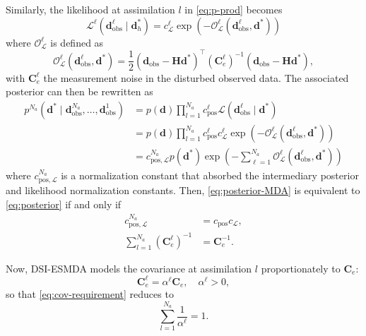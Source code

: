 Similarly, the likelihood at assimilation $l$ in \cref{eq:p-prod} becomes
%
\begin{equation}
    \mathcal{L}^\ell(\mathbf{d}_\text{obs}^\ell \mid \mathbf{d}^*_h) =
    c^\ell_\mathcal{L} \exp(-\mathcal{O}^\ell_\mathcal{L}(\mathbf{d}^\ell_\text{obs}, \mathbf{d}^*))
\end{equation}
%
where $\mathcal{O}^\ell_\mathcal{L}$ is defined as
%
\begin{equation}
    \mathcal{O}^\ell_\mathcal{L}(\mathbf{d}^\ell_\text{obs}, \mathbf{d}^*) =
    \frac{1}{2} 
    (\mathbf{d}_\text{obs} - \mathbf{H}\mathbf{d}^*)^\top 
    (\mathbf{C}^\ell_e)^{-1}
    (\mathbf{d}_\text{obs} - \mathbf{H}\mathbf{d}^*),
\end{equation}
%
with $\mathbf{C}^\ell_e$ the measurement noise in the disturbed observed data.
%
The associated posterior can then be rewritten as 
%
\begin{align}
    p^{N_a}(\mathbf{d}^* \mid \mathbf{d}^{N_a}_\text{obs}, \dots, \mathbf{d}^1_\text{obs}) 
    &=
    p(\mathbf{d}) 
    \prod_{l=1}^{N_a} 
        c^\ell_\text{pos} 
        \mathcal{L}(\mathbf{d}^\ell_\text{obs}\mid \mathbf{d}^*) \\
    &=
    p(\mathbf{d}) 
    \prod_{l=1}^{N_a} 
        c^\ell_\text{pos} 
        c^\ell_\mathcal{L}
        \exp(-\mathcal{O}^\ell_\mathcal{L}(\mathbf{d}^\ell_\text{obs}, \mathbf{d}^*)) \\
    &=
    c^{N_a}_{\text{pos},\mathcal{L}} 
    p(\mathbf{d}^*)
    \exp\left(
        -\sum_{\ell=1}^{N_a} \mathcal{O}^\ell_\mathcal{L}(\mathbf{d}^\ell_\text{obs}, \mathbf{d}^*)
    \right) 
\label{eq:posterior-MDA}
\end{align}
%
where $c^{N_a}_{\text{pos},\mathcal{L}}$ is a normalization constant that 
absorbed the intermediary posterior and likelihood normalization constants.
%
Then, \cref{eq:posterior-MDA} is equivalent to \cref{eq:posterior} if and only if 
%
\begin{subequations}
    \begin{alignat}{4}
        c^{N_a}_{\text{pos},\mathcal{L}} &= c_\text{pos} c_\mathcal{L}, \\
        \sum_{l=1}^{N_a} (\mathbf{C}^\ell_e)^{-1} &= \mathbf{C}^{-1}_e.
        \label{eq:cov-requirement}
    \end{alignat}
\end{subequations}

Now, DSI-ESMDA models the covariance at assimilation $l$ proportionately to $\mathbf{C}_e$:
%
\begin{equation}
    \mathbf{C}^\ell_e = \alpha^\ell \mathbf{C}_e, 
    \quad 
    \alpha^\ell > 0,
\label{eq:cov-as-inflation}
\end{equation}
%
so that \cref{eq:cov-requirement} reduces to
%
\begin{equation}
    \sum_{l=1}^{N_a} \frac{1}{\alpha^\ell} = 1.
\label{eq:alpha-requirement}
\end{equation}


